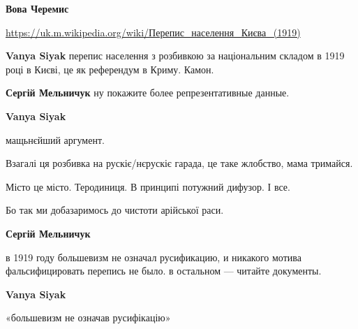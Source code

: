 \begin{itemize}
\begin{itemize}
\textbf{Вова Черемис} 

\url{https://uk.m.wikipedia.org/wiki/Перепис_населення_Києва_(1919)}

 
\textbf{Vanya Siyak} перепис населення з розбивкою за національним складом в 1919 році в Києві, це як референдум в Криму. Камон.

 
\textbf{Сергій Мельничук} ну покажите более репрезентативные данные.

 
\textbf{Vanya Siyak} 

мащьнєйший аргумент.

Взагалі ця розбивка на рускіє/нєрускіє гарада, це таке жлобство, мама тримайся.

Місто це місто. Теродиниця. В принципі потужний дифузор. І все.

Бо так ми добазаримось до чистоти арійської раси.

 
\textbf{Сергій Мельничук} 

в 1919 году большевизм не означал русификацию, и никакого мотива
фальсифицировать перепись не было. в остальном — читайте документы.


 
\textbf{Vanya Siyak} 

«большевизм не означав русифікацію»


\end{itemize}
\end{itemize}

